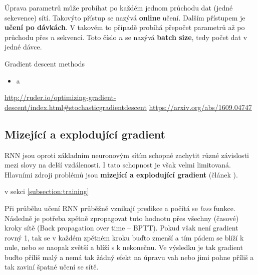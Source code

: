 Úprava parametrů může probíhat po každém jednom průchodu dat (jedné sekevence) sítí. Takovýto přístup se nazývá \textbf{online} učení. Dalším přístupem je \textbf{učení po dávkách}. V takovém to případě probíhá přepočet parametrů až po průchodu přes $n$ sekvencí. Toto číslo $n$ se nazývá \textbf{batch size}, tedy počet dat v jedné dávce.



Gradient descent methods
\begin{itemize}
  \item a
\end{itemize}

\url{http://ruder.io/optimizing-gradient-descent/index.html#stochasticgradientdescent}
\url{https://arxiv.org/abs/1609.04747}


\subsection{Mizející a explodující gradient} \label{subsection:gradient}
RNN jsou oproti základním neuronovým sítím schopné zachytit různé závislosti mezi slovy na delší vzdálenosti. I tato schopnost je však velmi limitovaná. Hlavními zdroji problémů jsou \textbf{mizející a explodující gradient} (článek \cite{gradientProblems}).

 v sekci \ref{subsection:training}

Při průběhu učení RNN průběžně vznikají predikce a počítá se \emph{loss} funkce. Následně je potřeba zpětně zpropagovat tuto hodnotu přes všechny (časové) kroky sítě (Back propagation over time -- BPTT). Pokud však není gradient rovný 1, tak se v každém zpětném kroku buďto zmenší a tím pádem se blíží k nule, nebo se naopak zvětší a blíží s k nekonečnu. Ve výsledku je tak gradient buďto příliš malý a nemá tak žádný efekt na úpravu vah nebo jimi pohne příliš a tak zaviní špatné učení se sítě.

